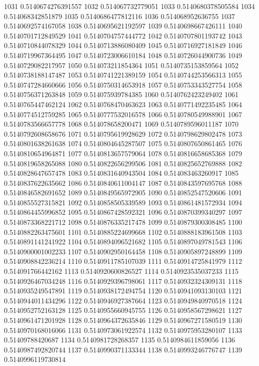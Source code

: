 1031 0.5140674276391557
1032 0.514067732779051
1033 0.5140680378505584
1034 0.514068342851879
1035 0.5140686477812116
1036 0.514068952636755
1037 0.5140692574167058
1038 0.5140695621192597
1039 0.5140698667426111
1040 0.5140701712849529
1041 0.5140704757444772
1042 0.5140707801193742
1043 0.5140710844078329
1044 0.5140713886080409
1045 0.5140716927181849
1046 0.5140719967364495
1047 0.5140723006610184
1048 0.5140726044900736
1049 0.5140729082217957
1050 0.514073211854364
1051 0.5140735153859564
1052 0.5140738188147487
1053 0.5140741221389159
1054 0.5140744253566313
1055 0.5140747284660666
1056 0.5140750314653918
1057 0.5140753343527754
1058 0.5140756371263848
1059 0.514075939784385
1060 0.5140762423249402
1061 0.5140765447462124
1062 0.5140768470463623
1063 0.5140771492235485
1064 0.5140774512759285
1065 0.5140777532016578
1066 0.5140780549988901
1067 0.5140783566657778
1068 0.514078658200471
1069 0.5140789596011187
1070 0.5140792608658676
1071 0.5140795619928629
1072 0.5140798629802478
1073 0.5140801638261638
1074 0.5140804645287507
1075 0.5140807650861465
1076 0.5140810654964871
1077 0.5140813657579064
1078 0.5140816658685368
1079 0.5140819658265088
1080 0.5140822656299506
1081 0.5140825652769888
1082 0.5140828647657478
1083 0.5140831640943504
1084 0.514083463260917
1085 0.5140837622635662
1086 0.5140840611004147
1087 0.5140843597695768
1088 0.5140846582691652
1089 0.5140849565972905
1090 0.5140852547520606
1091 0.5140855527315821
1092 0.5140858505339589
1093 0.5140861481572934
1094 0.5140864455996852
1095 0.5140867428592321
1096 0.5140870399340297
1097 0.5140873368221712
1098 0.5140876335217478
1099 0.5140879300308485
1100 0.5140882263475601
1101 0.5140885224699668
1102 0.5140888183961508
1103 0.5140891141241922
1104 0.5140894096521682
1105 0.5140897049781543
1106 0.5140900001002233
1107 0.5140902950164458
1108 0.5140905897248899
1109 0.5140908842236214
1110 0.5140911785107039
1111 0.5140914725841979
1112 0.514091766442162
1113 0.5140920600826527
1114 0.5140923535037233
1115 0.5140926467034248
1116 0.5140929396798061
1117 0.5140932324309131
1118 0.5140935249547891
1119 0.5140938172494754
1120 0.5140941093130103
1121 0.5140944011434296
1122 0.5140946927387664
1123 0.5140949840970518
1124 0.5140952752163128
1125 0.5140955660945755
1126 0.5140958567298621
1127 0.5140961471201928
1128 0.5140964372635846
1129 0.5140967271580519
1130 0.5140970168016066
1131 0.5140973061922574
1132 0.5140975953280107
1133 0.51409788420687
1134 0.5140981728268357
1135 0.5140984611859056
1136 0.5140987492820744
1137 0.5140990371133344
1138 0.5140993246776747
1139 0.5140996119730814
